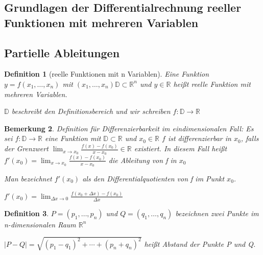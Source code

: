 \documentclass[fontset=ubuntu,11pt,a4paper,fleqn,headsepline]{scrreprt}
\newtheorem{defi}{Definition}[section]
\newtheorem{bemerkung}[defi]{Bemerkung}
\begin{document}
    \begin{multicols}{2}

\renewcommand{\cleardoublepage}{}
\renewcommand{\clearpage}{}

        \chapter*{Grundlagen der Differentialrechnung reeller Funktionen mit mehreren Variablen}
    
        \section*{Partielle Ableitungen}
        
        \begin{defi}[reelle Funktionen mit n Variablen]
            Eine Funktion \(y = f(x_1, \dots, x_n)\) mit \(\left(x_1, \dots, x_n\right) \mathbb{D} \subset \mathbb{R}^n\) und \(y \in \mathbb{R}\) heißt reelle Funktion mit mehreren Variablen.
    
            \(\mathbb{D}\) beschreibt den Definitionsbereich und wir schreiben \(f:\mathbb{D} \to \mathbb{R}\)
        \end{defi}
    
    \begin{bemerkung}
        Definition für Differenzierbarkeit im eindimensionalen Fall:
        Es sei \(f:\mathbb{D} \to \mathbb{R}\) eine Funktion mit \(\mathbb{D} \subset \mathbb{R}\) und \(x_0 \in \mathbb{R}\)
        $f$ ist differenzierbar in \(x_0\), falls der Grenzwert \(\lim_{x\to x_0} {\frac{f\left(x\right) - f\left(x_0\right)}{x-x_0}} \in \mathbb{R}\) existiert.
        In diesem Fall heißt \(f'\left(x_0\right) = \lim_{x\to x_0}{\frac{f\left(x\right) - f\left(x_0\right)}{x-x_0}}\) die Ableitung von f in \(x_0\)

        Man bezeichnet \(f'\left(x_0\right)\) als den Differentialquotienten von f im Punkt \(x_0\).
        
        \(f'\left(x_0\right) = \lim_{\Delta x\to0}{\frac{f\left(x_0 + \Delta x\right) - f\left(x_0\right)}{\Delta x}}\)
        
    \end{bemerkung}
    
    \begin{defi}
        \(P=(p_1,\ldots,p_n)\) und \(Q=(q_1,\ldots,q_n)\) bezeichnen zwei Punkte im n-dimensionalen Raum \(\mathbb{R}^n\)
        
        \(\left|P-Q\right|=\sqrt{{\left(p_1-q_1\right)}^2 + \cdots + {\left(p_n+q_n\right)}^2}\) heißt Abstand der Punkte P und Q.
        

\end{defi}
\end{multicols}
\end{document}
